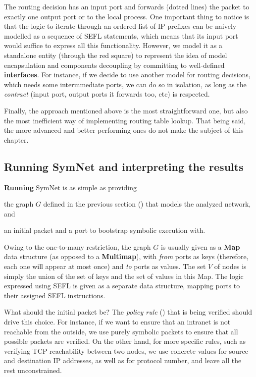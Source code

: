 The routing decision has an input port and forwards (dotted lines) the packet
to exactly one output port or to the local process.  One important thing to
notice is that the logic to iterate through an ordered list of IP prefixes can
be naively modelled as a sequence of  SEFL statements,
which means that its input port would suffice to express all this
functionality.  However, we model it as a standalone entity (through the red
square) to represent the idea of model encapsulation and components decoupling
by committing to well-defined \textbf{interfaces}.  For instance, if we decide
to use another model for routing decisions, which needs some intermmediate
ports, we can do so in isolation, as long as the \emph{contract} (input port,
output ports it forwards too, etc) is respected.

Finally, the  approach mentioned above is the most
straightforward one, but also the most inefficient way of implementing routing
table lookup. That being said, the more advanced and better performing ones do
not make the subject of this chapter.

\subsection{Running SymNet and interpreting the results}
\label{sub-sec:running-symnet}

\textbf{Running} SymNet is as simple as providing
\begin{enumerate*}[a)]
  \item the graph $G$ defined in the previous section
    () that models the analyzed
    network, and
  \item an initial packet and a port to bootstrap symbolic execution with.
\end{enumerate*}

Owing to the one-to-many restriction, the graph $G$ is usually given as a
\textbf{Map} data structure (as opposed to a \textbf{Multimap}), with
\emph{from} ports as keys (therefore, each one will appear at most once) and
\emph{to} ports as values.  The set $V$ of nodes is simply the union of the set
of keys and the set of values in this Map.  The logic expressed using SEFL is
given as a separate data structure, mapping ports to their assigned SEFL
instructions.

What should the initial packet be?  The \emph{policy rule}
() that is being verified
should drive this choice.  For instance, if we want to ensure that an intranet
is not reachable from the outside, we use purely symbolic packets to ensure
that all possible packets are verified.  On the other hand, for more specific
rules, such as verifying TCP reachability between two nodes, we use concrete
values for source and destination IP addresses, as well as for protocol number,
and leave all the rest unconstrained.

